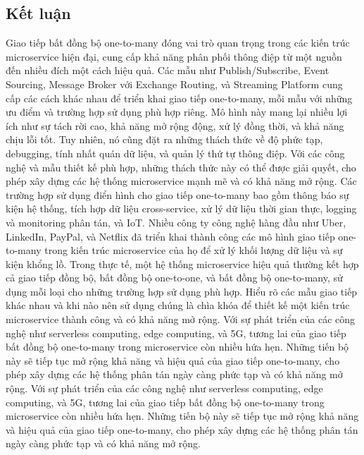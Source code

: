 \subsection{Kết luận}
Giao tiếp bất đồng bộ one-to-many đóng vai trò quan trọng trong các kiến trúc microservice hiện đại, cung cấp khả năng phân phối thông điệp từ một nguồn đến nhiều đích một cách hiệu quả. Các mẫu như Publish/Subscribe, Event Sourcing, Message Broker với Exchange Routing, và Streaming Platform cung cấp các cách khác nhau để triển khai giao tiếp one-to-many, mỗi mẫu với những ưu điểm và trường hợp sử dụng phù hợp riêng.
Mô hình này mang lại nhiều lợi ích như sự tách rời cao, khả năng mở rộng động, xử lý đồng thời, và khả năng chịu lỗi tốt. Tuy nhiên, nó cũng đặt ra những thách thức về độ phức tạp, debugging, tính nhất quán dữ liệu, và quản lý thứ tự thông điệp. Với các công nghệ và mẫu thiết kế phù hợp, những thách thức này có thể được giải quyết, cho phép xây dựng các hệ thống microservice mạnh mẽ và có khả năng mở rộng.
Các trường hợp sử dụng điển hình cho giao tiếp one-to-many bao gồm thông báo sự kiện hệ thống, tích hợp dữ liệu cross-service, xử lý dữ liệu thời gian thực, logging và monitoring phân tán, và IoT. Nhiều công ty công nghệ hàng đầu như Uber, LinkedIn, PayPal, và Netflix đã triển khai thành công các mô hình giao tiếp one-to-many trong kiến trúc microservice của họ để xử lý khối lượng dữ liệu và sự kiện khổng lồ.
Trong thực tế, một hệ thống microservice hiệu quả thường kết hợp cả giao tiếp đồng bộ, bất đồng bộ one-to-one, và bất đồng bộ one-to-many, sử dụng mỗi loại cho những trường hợp sử dụng phù hợp. Hiểu rõ các mẫu giao tiếp khác nhau và khi nào nên sử dụng chúng là chìa khóa để thiết kế một kiến trúc microservice thành công và có khả năng mở rộng.
Với sự phát triển của các công nghệ như serverless computing, edge computing, và 5G, tương lai của giao tiếp bất đồng bộ one-to-many trong microservice còn nhiều hứa hẹn. Những tiến bộ này sẽ tiếp tục mở rộng khả năng và hiệu quả của giao tiếp one-to-many, cho phép xây dựng các hệ thống phân tán ngày càng phức tạp và có khả năng mở rộng.
Với sự phát triển của các công nghệ như serverless computing, edge computing, và 5G, tương lai của giao tiếp bất đồng bộ one-to-many trong microservice còn nhiều hứa hẹn. Những tiến bộ này sẽ tiếp tục mở rộng khả năng và hiệu quả của giao tiếp one-to-many, cho phép xây dựng các hệ thống phân tán ngày càng phức tạp và có khả năng mở rộng.